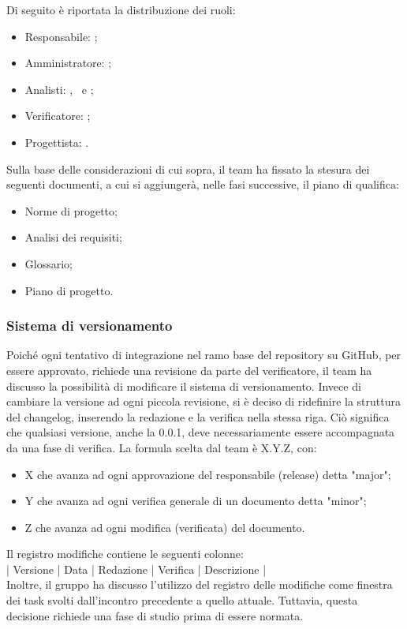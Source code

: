 \vspace{0.5\baselineskip}
Di seguito è riportata la distribuzione dei ruoli:
\begin{itemize}
	\item Responsabile: \riccardo;
	\item Amministratore: \tommaso;
	\item Analisti: \marco, \martina \ e \sebastiano;
	\item Verificatore: \raul;
	\item Progettista: \mattia.
\end{itemize}

\vspace{0.5\baselineskip}
Sulla base delle considerazioni di cui sopra, il team ha fissato la stesura dei seguenti documenti, a cui si aggiungerà, nelle fasi successive, il piano di qualifica:
\begin{itemize}
	\item Norme di progetto;
	\item Analisi dei requisiti;
	\item Glossario;
	\item Piano di progetto.
\end{itemize}

\subsubsection{Sistema di versionamento} \label{versionamento}
Poiché ogni tentativo di integrazione nel ramo base del repository su GitHub, per essere approvato, richiede una revisione da parte del verificatore, il team ha discusso la possibilità di modificare il sistema di versionamento. Invece di cambiare la versione ad ogni piccola revisione, si è deciso di ridefinire la struttura del changelog,  inserendo la redazione e la verifica nella stessa riga. Ciò significa che qualsiasi versione, anche la 0.0.1, deve necessariamente essere accompagnata da una fase di verifica. La formula scelta dal team è X.Y.Z, con:
\begin{itemize}
	\item X che avanza ad ogni approvazione del responsabile (release) detta "major";
	\item Y che avanza ad ogni verifica generale di un documento detta "minor";
	\item Z che avanza ad ogni modifica (verificata) del documento.
\end{itemize}

\vspace{0.5\baselineskip}
Il registro modifiche contiene le seguenti colonne: \\
\vspace{\baselineskip}
\hspace{1cm} | Versione | Data | Redazione | Verifica | Descrizione | \\
Inoltre, il gruppo ha discusso l'utilizzo del registro delle modifiche come finestra dei task svolti dall'incontro precedente a quello attuale. Tuttavia, questa decisione richiede una fase di studio prima di essere normata.

